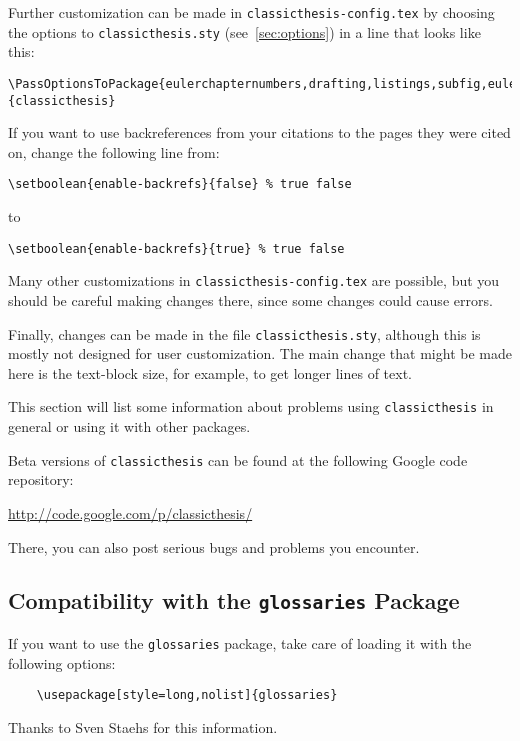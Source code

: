 Further customization can be made in \texttt{classicthesis-config.tex}
by choosing the options to \texttt{classicthesis.sty} 
(see~\autoref{sec:options}) in a line that looks like this:

\begin{lstlisting}[frame=lt]
\PassOptionsToPackage{eulerchapternumbers,drafting,listings,subfig,eulermath,parts}{classicthesis}
\end{lstlisting}

If you want to use backreferences from your citations to the pages
they were cited on, change the following line from:
\begin{lstlisting}[breaklines=false,frame=lt]
\setboolean{enable-backrefs}{false} % true false
\end{lstlisting}
to
\begin{lstlisting}[breaklines=false,frame=lt]
\setboolean{enable-backrefs}{true} % true false
\end{lstlisting}

Many other customizations in \texttt{classicthesis-config.tex} are
possible, but you should be careful making changes there, since some
changes could cause errors.

Finally, changes can be made in the file \texttt{classicthesis.sty},%
 although this is mostly not designed for user customization. The
main change that might be made here is the text-block size, for example,
to get longer lines of text.


This section will list some information about problems using
\texttt{classic\-thesis} in general or using it with other packages.

Beta versions of \texttt{classicthesis} can be found at the following 
Google code repository:
\begin{center}
	\url{http://code.google.com/p/classicthesis/}
\end{center}
There, you can also post serious bugs and problems you encounter.

\subsection*{Compatibility with the \texttt{glossaries} Package}
If you want to use the \texttt{glossaries} package, take care of loading it 
with the following options:
\begin{verbatim}
	\usepackage[style=long,nolist]{glossaries}
\end{verbatim}
Thanks to Sven Staehs for this information. 


